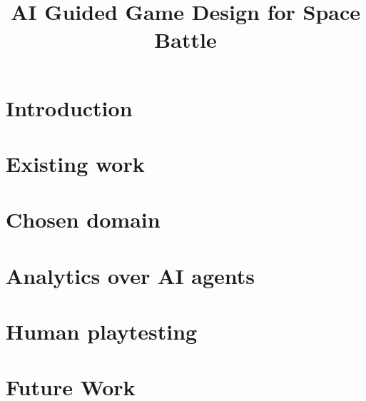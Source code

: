 \documentclass[conference, 9pt]{IEEEtran}
\title{AI Guided Game Design for Space Battle}
\author{
	\IEEEauthorblockN{Athanasios Kokkinakis}
	\IEEEauthorblockA{University of York}
	\and
	\IEEEauthorblockN{Matthew Bedder}
	\IEEEauthorblockA{University of York}
	\and
	\IEEEauthorblockN{Andrei Iacob}
	\IEEEauthorblockA{University of York}
	\and
	\IEEEauthorblockN{Mihail Morosan}
	\IEEEauthorblockA{University of York}
}
\begin{document}
\maketitle
\section{Introduction}

\section{Existing work}

\section{Chosen domain}

\section{Analytics over AI agents}

\section{Human playtesting}

\section{Future Work}


\printbibliography[heading=bibnumbered]
\end{document}

